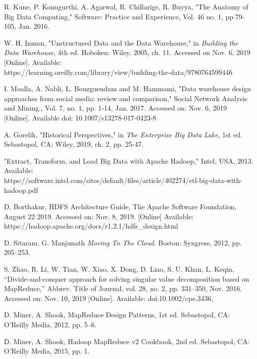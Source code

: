 \documentclass[journal]{IEEEtran}
\begin{document}
\begin{thebibliography}{1}

R. Kune, P. Konugurthi, A. Agarwal, R. Chillarige, R. Buyya,
 "The Anatomy of Big Data Computing," Software: Practice and Experience,
 Vol. 46 no. 1, pp.79-105, Jan. 2016. 

W. H. Inmon, "Unstructured Data and the Data Warehouse," in 
  \emph{Building the Data Warehouse},
  4th ed. Hoboken: Wiley, 2005, ch. 11.
  Accessed on Nov. 6, 2019 [Online]. 
  Available: \\ https://learning.oreilly.com/library/view/building-the-data/9780764599446

I. Moalla, A. Nabli, L. Bouzguendam and M. Hammami,
 "Data warehouse design approaches from social media: review and comparison,"
 Social Network Analysis and Mining., Vol. 7, no. 1, pp. 1-14, Jan. 2017.
 Accessed on: Nov. 6, 2019 [Online]. 
 Available doi: 10.1007/s13278-017-0423-8

A. Gorelik, "Historical Perspectives," in 
 \emph{The Enterprise Big Data Lake},
 1st ed. Sebastopol, CA: Wiley, 2019, ch. 2, pp. 25-47.

 "Extract, Transform, and Load Big Data with Apache Hadoop," Intel, USA, 2013.
 Available:\\ https://software.intel.com/sites/default/files/article/402274/etl-big-data-with-hadoop.pdf

D. Borthakur, HDFS Architecture Guide, The Apache Software Foundation,
 August 22 2019. Accessed on: Nov. 8, 2019. [Online] Available: \\
 https://hadoop.apache.org/docs/r1.2.1/hdfs\_design.html

D. Sitaram, G. Manjunath \textit{Moving To The Cloud}. Boston: Syngress, 2012, pp. 205–253.

S. Zhao, R. Li, W. Tian, W. Xiao, X. Dong, D. Liao, S. U. Khan, L. Keqin, 
 “Divide-and-conquer approach for solving singular value decomposition based on MapReduce,” Abbrev. Title of Journal, vol. 28, no. 2, pp. 331–350, Nov. 2016. 
 Accessed on: Nov. 10, 2019 [Online]. Available: doi:10.1002/cpe.3436, 

D. Miner, A. Shook, MapReduce Design Patterns, 1st ed. Sebastopol, CA: O'Reilly Media, 2012,
 pp. 5–6.

D. Miner, A. Shook, Hadoop MapReduce v2 Cookbook, 2nd ed. Sebastopol, CA: O'Reilly Media,
 2015, pp. 1.
 

\end{thebibliography}
\end{document}
